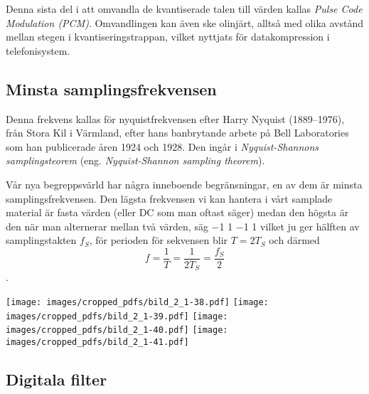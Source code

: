 Denna sista del i att omvandla de kvantiserade talen till värden kallas
\emph{Pulse Code Modulation (PCM)}.
Omvandlingen kan även ske olinjärt, alltså med olika avstånd mellan stegen i
kvantiseringstrappan, vilket nyttjats för datakompression i telefonisystem.

\subsection{Minsta samplingsfrekvensen}
\label{nyquist}

\begin{tcolorbox}[title=Historia]
Denna frekvens kallas för nyquistfrekvensen efter Harry Nyquist (1889--1976),
från Stora Kil i Värmland, efter hans banbrytande arbete på Bell Laboratories
som han publicerade åren 1924 och 1928. Den ingår i \emph{Nyquist-Shannons
samplingsteorem} (eng. \emph{Nyquist-Shannon sampling theorem}).
\end{tcolorbox}

Vår nya begreppsvärld har några inneboende begränsningar, en av dem är minsta
samplingsfrekvensen.
Den lägsta frekvensen vi kan hantera i vårt samplade material är fasta värden
(eller DC som man oftast säger) medan den högsta är den när man alternerar
mellan två värden, säg \num{-1} \num{+1} \num{-1} \num{+1} vilket ju ger hälften
av samplingstakten \(f_S\), för perioden för sekvensen blir \(T = 2T_S\) och
därmed
\[f=\frac{1}{T}=\frac{1}{2T_S}=\frac{f_S}{2}\].

\begin{figure*}
\begin{center}
\texttt{[image: images/cropped\_pdfs/bild\_2\_1-38.pdf]}
\texttt{[image: images/cropped\_pdfs/bild\_2\_1-39.pdf]}
\texttt{[image: images/cropped\_pdfs/bild\_2\_1-40.pdf]}
\texttt{[image: images/cropped\_pdfs/bild\_2\_1-41.pdf]}
\caption{Sampling av DC; \qty{3,6}{\kilo\hertz}; \qty{12,4}{\kilo\hertz} och \qty{38}{\kilo\hertz} med \qty{40}{kS/s} samplingstakt}
\label{fig:BildII1-38}
\end{center}
\end{figure*}

\subsection{Digitala filter}
\label{digitala filter}

